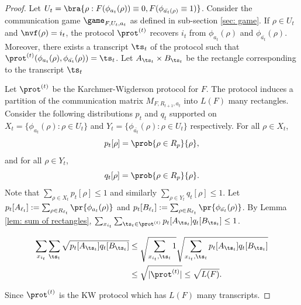 \begin{proof}
Let $U_t = \bra{\rho: F(\phi_{a_t}(\rho)) \equiv 0, F(\phi_{\bar{a_t}(\rho)} \equiv 1) }$.
Consider the communication game $\game_{F,U_t,a_t}$ as defined in sub-section \ref{sec: game}.
If $\rho \in U_t$ and $\nvf(\rho) = i_t$, the protocol $\prot^{(t)}$ recovers $i_t$ from $\phi_{a_t}(\rho)$ and $\phi_{\bar{a_t}}(\rho)$. 
Moreover, there exists a transcript $\ts_t$ of the protocol 
such that $\prot^{(t)}(\phi_{a_t}(\rho),\phi_{\bar{a_t}}(\rho)) = \ts_t $. Let $A_{\ts_t} \times B_{\ts_t}$
be the rectangle corresponding to the transcript $\ts_t$

Let $\prot^{(t)}$ be the Karchmer-Wigderson protocol for $F$. 
The protocol induces a partition of the communication matrix $M_{F,R_{t+1},a_t}$ into $L(F)$ many rectangles.
    Consider the following distributions $p_t$ and $q_t$ supported on $X_t = \{\phi_{a_t}(\rho) : \rho \in U_t\}$ and $Y_t = \{\phi_{\bar{a_t}}(\rho): \rho \in U_t\}$ respectively.
    For all $\rho \in X_t$, 
            $$p_t[\rho] = \prob{\rho \in R_p}{\rho},$$
        and for all $\rho \in Y_t$, 
            $$q_t[\rho] = \prob{\rho \in R_p}{\rho}.$$ 
        Note that $\sum_{\rho \in X_t} p_t[\rho] \leq 1$ and similarly 
    $\sum_{\rho \in Y_t} q_t[\rho] \leq 1$.
    Let 
    $p_t[A_{\ell_t}] := \sum_{\rho \in R_{\ell_t}} \pr{\phi_{a_t}(\rho)}$ and $p_t[B_{\ell_t}] := \sum_{\rho \in R_{\ell_t}} \pr{\phi_{\bar{a_t}}(\rho)}$.
    By Lemma \ref{lem: sum of rectangles},
    $\sum_{x_{i_t}}\sum_{\ts_t \in \prot^{(t)}} p_t[A_{\ts_t}]q_t[B_{\ts_t}] \leq 1$.

\begin{align*}
    \sum_{x_{i_t}}\sum_{\ts_t} \sqrt{ p_{t}[A_{\ts_t}] q_t
    [B_{\ts_t}] }
        &\leq \sqrt{\sum_{x_{i_t},\ts_t} 1} \sqrt{\sum_{x_{i_t},\ts_t}p_t[A_{\ts_t}] q_t[B_{\ts_t}]}\\
        &\leq \sqrt{|\prot^{(t)}|} \leq \sqrt{L(F)}.
\end{align*}

Since $\prot^{(t)}$ is the KW protocol which has $L(F)$ many transcripts. 


\end{proof}
